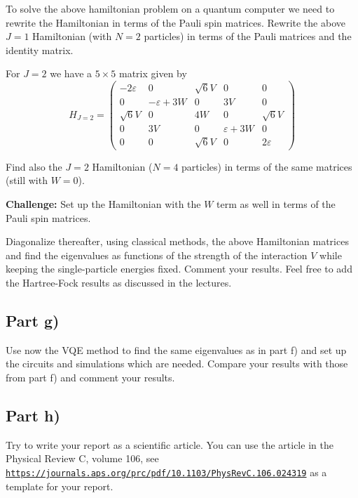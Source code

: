 \documentclass[%
oneside,                 %
final,                   %
10pt]{article}
\begin{document}
To solve the above hamiltonian problem on a quantum computer we need
to rewrite the Hamiltonian in terms of the Pauli spin
matrices. Rewrite the above $J=1$ Hamiltonian (with $N=2$ particles)
in terms of the Pauli matrices and the identity matrix.

For $J=2$ we have a $5\times 5$ matrix given by
\begin{equation}
H_{J = 2} =
\begin{pmatrix}
-2\varepsilon & 0 & \sqrt{6}V & 0 & 0 \\
0 & -\varepsilon + 3W & 0 & 3V & 0 \\
\sqrt{6}V & 0 & 4W & 0 & \sqrt{6}V \\
0 & 3V & 0 & \varepsilon + 3W & 0 \\
0 & 0 & \sqrt{6}V & 0 & 2\varepsilon
\end{pmatrix}
\end{equation}

Find also the $J=2$ Hamiltonian ($N=4$ particles) in terms of the same matrices (still with $W=0$).

\textbf{Challenge:} Set up the Hamiltonian with the $W$ term as well in terms of the Pauli spin matrices.

Diagonalize thereafter, using classical methods, the above Hamiltonian matrices and find the
eigenvalues as functions of the strength of the interaction $V$ while
keeping the single-particle energies fixed. Comment your results. Feel
free to add the Hartree-Fock results as discussed in the lectures.

\subsection*{Part g)}

Use now the VQE method to find the same eigenvalues as in part f) and
set up the circuits and simulations which are needed. Compare your
results with those from part f) and comment your results.

\subsection*{Part h)}

Try to write your report as a scientific article. You can use the article in the Physical Review C, volume 106, see \href{{https://journals.aps.org/prc/pdf/10.1103/PhysRevC.106.024319}}{\nolinkurl{https://journals.aps.org/prc/pdf/10.1103/PhysRevC.106.024319}} as a template for your report.
\end{document}

